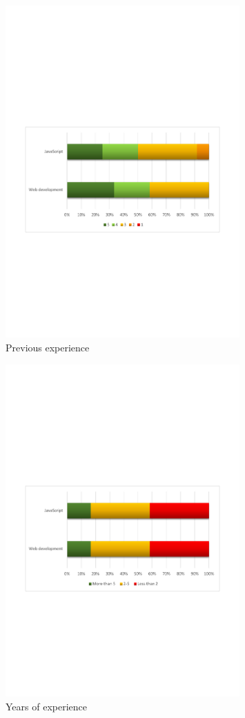 \begin{figure}[H]
  \centering
    \includegraphics[width=0.8\textwidth]{images/charts/xp.pdf}
	\caption[Previous experience of participants]{Previous experience}
	\label{fig:xp}
\end{figure}

\begin{figure}[H]
  \centering
    \includegraphics[width=0.8\textwidth]{images/charts/years_of_xp.pdf}
	\caption[Years of experience]{Years of experience}
	\label{fig:years_of_xp}
\end{figure}

